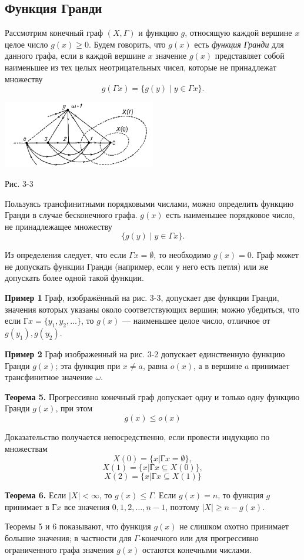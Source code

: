 \subsection{Функция Гранди}

Рассмотрим конечный граф $(X, \Gamma)$ и функцию $g$, относящую каждой вершине $x$ целое число $g(x) \geq 0$. Будем говорить, что $g(x)$ есть \textit{функция Гранди} для данного графа, если в каждой вершине $x$ значение $g(x)$ представляет собой наименьшее из тех целых неотрицательных чисел, которые не принадлежат множеству
\[
g(\Gamma x) = \{g(y) \mid y \in \Gamma x\}.
\]

\begin{center}
    \includegraphics[width=0.5\textwidth]{graph.png}
\end{center}

\begin{center}
    Рис. 3-3
\end{center}

Пользуясь трансфинитными порядковыми числами, можно определить функцию Гранди в случае бесконечного графа. $g(x)$ есть наименьшее порядковое число, не принадлежащее множеству
\[
\{g(y) \mid y \in \Gamma x\}.
\]

Из определения следует, что если $\Gamma x = \emptyset$, то необходимо $g(x) = 0$. Граф может не допускать функции Гранди (например, если у него есть петля) или же допускать более одной такой функции.

\textbf{Пример 1} Граф, изображённый на рис. 3-3, допускает две функции Гранди, значения которых указаны около соответствующих вершин; можно убедиться, что если $Гx = \{y_1, y_2, \ldots\}$, то $g(x)$ — наименьшее целое число, отличное от $g(y_1), g(y_2)$.

\textbf{Пример 2} Граф изображенный на рис. 3-2 допускает единственную функцию Гранди $g(x)$; эта функция при $x \neq a$, равна $o(x)$, а в вершине $a$ принимает трансфинитное значение $\omega$.

\textbf{Теорема 5.} Прогрессивно конечный граф допускает одну и только одну функцию Гранди $g(x)$, при этом
\[ g(x) \leq o(x) \]

Доказательство получается непосредственно, если провести индукцию по множествам
\[
X(0) = \{x|Гx = \emptyset\},
\]
\[
X(1) = \{x|Гx \subseteq X(0)\},
\]
\[
X(2) = \{x|Гx \subseteq X(1)\}
\]

\textbf{Теорема 6.} Если $|X| < \infty$, то $g(x) \leq \Gamma$. Если $g(x) = n$, то функция $g$ принимает в $Гx$ все значения $0, 1, 2, \ldots, n-1$, поэтому $|X| \geq n - g(x)$.

Теоремы 5 и 6 показывают, что функция $g(x)$ не слишком охотно принимает большие значения; в частности для $\Gamma$-конечного или для прогрессивно ограниченного графа значения $g(x)$ остаются конечными числами.

